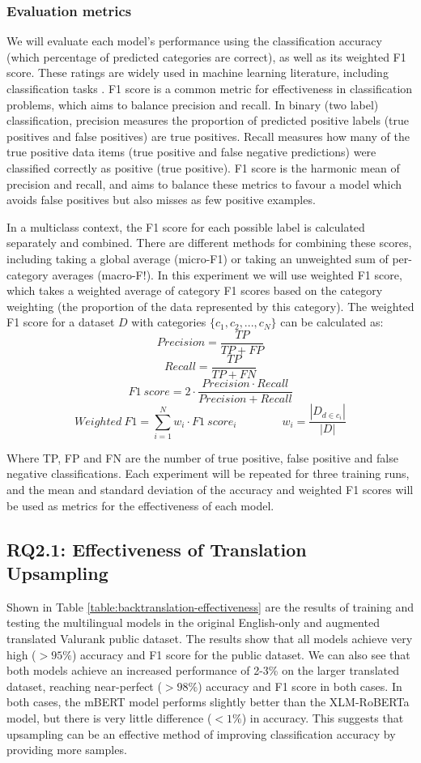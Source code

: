 \documentclass{l4proj}
\begin{document}
\subsubsection{Evaluation metrics}
We will evaluate each model's performance using the  classification accuracy (which percentage of predicted categories are correct), as well as its weighted F1 score. These ratings are widely used in machine learning literature, including classification tasks \citep{alam2020bangla, al2020multiple, ranasinghe2020multilingual}. F1 score is a common metric for effectiveness in classification problems, which aims to balance precision and recall. In binary (two label) classification, precision measures the proportion of predicted positive labels (true positives and false positives) are true positives. Recall measures how many of the true positive data items (true positive and false negative predictions) were classified correctly as positive (true positive). F1 score is the harmonic mean of precision and recall, and aims to balance these metrics to favour a model which avoids false positives but also misses as few positive examples. \par
In a multiclass context, the F1 score for each possible label is calculated separately and combined. There are different methods for combining these scores, including taking a global average (micro-F1) or taking an unweighted sum of per-category averages (macro-F!). In this experiment we will use weighted F1 score, which takes a weighted average of category F1 scores based on the category weighting (the proportion of the data represented by this category). The weighted F1 score for a dataset $D$ with categories $\{c_1, c_2, ..., c_N\}$ can be calculated as:
$$Precision=\frac{TP}{TP+FP}$$ 
$$Recall=\frac{TP}{TP+FN}
$$ $$F1 \ score=2 \cdot \frac{Precision \cdot Recall}{Precision + Recall}$$
$$Weighted \ F1=\sum_{i=1}^{N}w_i \cdot F1 \ score_i \quad \quad \quad \quad w_i=\frac{|D_{d \in c_i}|}{|D|}$$

Where TP, FP and FN are the number of true positive, false positive and false negative classifications. Each experiment will be repeated for three training runs, and the mean and standard deviation of the accuracy and weighted F1 scores will be used as metrics for the effectiveness of each model.

\subsection{RQ2.1: Effectiveness of Translation Upsampling}
Shown in Table \ref{table:backtranslation-effectiveness} are the results of training and testing the multilingual models in the original English-only and augmented translated Valurank public dataset. The results show that all models achieve very high ($>95\%$) accuracy and F1 score for the public dataset. We can also see that both models achieve an increased performance of 2-3\% on the larger translated dataset, reaching near-perfect ($>98\%$) accuracy and F1 score in both cases. In both cases, the mBERT model performs slightly better than the XLM-RoBERTa model, but there is very little difference ($<1\%$) in accuracy. This suggests that upsampling can be an effective method of improving classification accuracy by providing more samples.
\end{document}
